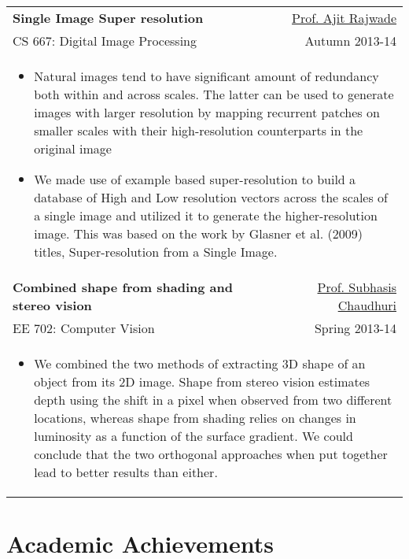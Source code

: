 \documentclass[a4paper,8pt]{article} %
\begin{document}
{\begin{tabular}{lr}
\textbf{Single Image Super resolution} & \href{https://www.cse.iitb.ac.in/~ajitvr/}{Prof. Ajit Rajwade}\\
CS 667: Digital Image Processing & Autumn 2013-14\\
\multicolumn{2}{p{16.5cm}}{
\begin{itemize}
	\item Natural images tend to have significant amount of redundancy both within and across scales. The latter can be used to generate images with larger resolution by mapping recurrent patches on smaller scales with their high-resolution counterparts in the original image
	\item We made use of example based super-resolution to build a database of High and Low resolution vectors across the scales of a single image and utilized it to generate the higher-resolution image. This was based on the work by Glasner et al. (2009) titles, Super-resolution from a Single Image.
\end{itemize}
}\\

\textbf{Combined shape from shading and stereo vision} & \href{https://www.ee.iitb.ac.in/~sc/}{Prof. Subhasis Chaudhuri}\\
EE 702: Computer Vision & Spring 2013-14 \\ 
\multicolumn{2}{p{16.5cm}}{
\begin{itemize}
	\item We combined the two methods of extracting 3D shape of an object from its 2D image. Shape from stereo vision estimates depth using the shift in a pixel when observed from two different locations, whereas shape from shading relies on changes in luminosity as a function of the surface gradient. We could conclude that the two orthogonal approaches when put together lead to better results than either. 
\end{itemize}
}\\

\end{tabular}


\section{Academic Achievements}

}
\end{document}
